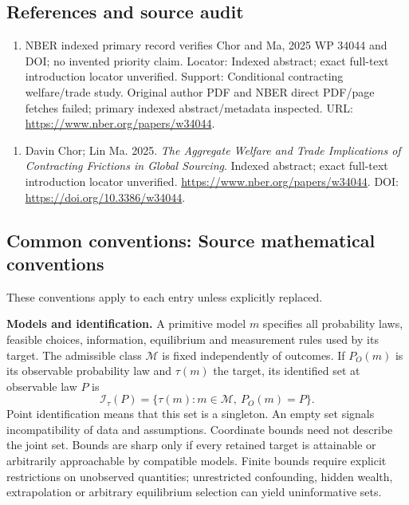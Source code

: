 \documentclass[11pt,a4paper]{article}
\begin{document}
\subsection*{References and source audit}
\begin{enumerate}
\item NBER indexed primary record verifies Chor and Ma, 2025 WP 34044 and DOI; no invented priority claim. Locator: Indexed abstract; exact full-text introduction locator unverified. Support: Conditional contracting welfare/trade study. Original author PDF and NBER direct PDF/page fetches failed; primary indexed abstract/metadata inspected. URL: \url{https://www.nber.org/papers/w34044}.
\end{enumerate}
\begin{enumerate}\raggedright
\item\hypertarget{definitions:source:30007631:1}{} Davin Chor; Lin Ma. 2025. \emph{The Aggregate Welfare and Trade Implications of Contracting Frictions in Global Sourcing}. Indexed abstract; exact full-text introduction locator unverified.
\url{https://www.nber.org/papers/w34044}.
DOI: \url{https://doi.org/10.3386/w34044}.
\end{enumerate}

\subsection*{Common conventions: Source mathematical conventions}

These conventions apply to each entry unless explicitly replaced.

\textbf{Models and identification.} A primitive model \(m\) specifies all probability laws, feasible choices, information, equilibrium and measurement rules used by its target. The admissible class \(\mathcal M\) is fixed independently of outcomes. If \(P_O(m)\) is its observable probability law and \(\tau(m)\) the target, its identified set at observable law \(P\) is
\[
 \mathcal I_\tau(P)=\{\tau(m):m\in\mathcal M,\ P_O(m)=P\}.
\]
Point identification means that this set is a singleton. An empty set signals incompatibility of data and assumptions. Coordinate bounds need not describe the joint set. Bounds are sharp only if every retained target is attainable or arbitrarily approachable by compatible models. Finite bounds require explicit restrictions on unobserved quantities; unrestricted confounding, hidden wealth, extrapolation or arbitrary equilibrium selection can yield uninformative sets.
\end{document}
